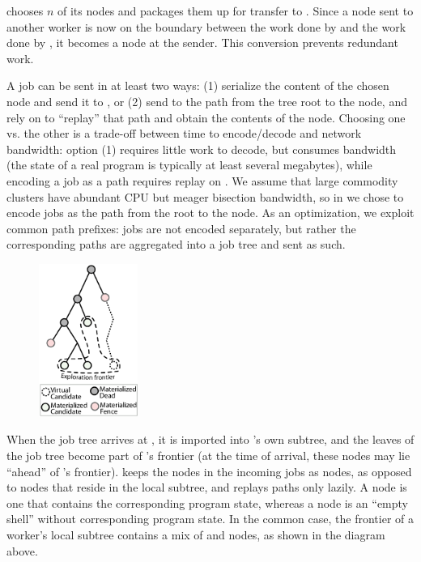 \wsrc chooses $n$ of its \candidate nodes and packages them up for transfer to \wdst.  Since a \candidate node sent to another worker is now on the boundary between the work done by \wsrc and the work done by \wdst, it becomes a \fence node at the sender.  This conversion prevents redundant work.

A job can be sent in at least two ways: (1) serialize the content of the chosen node and send it to \wdst, or (2) send to \wdst the path from the tree root to the node, and rely on \wdst to ``replay'' that path and obtain the contents of the node.  Choosing one vs. the other is a trade-off between time to encode/decode and network bandwidth: option (1) requires little work to decode, but consumes bandwidth (the state of a real program is typically at least several megabytes), while encoding a job as a path requires replay on \wdst.  We assume that large commodity clusters have abundant CPU but meager bisection bandwidth,
so in \cnine we chose to encode jobs as the path from the root to the \candidate node.  As an optimization, we exploit common path prefixes: jobs are not encoded separately, but rather the corresponding paths are aggregated into a job tree and sent as such.

\begin{figure}
\vspace{-5mm}
%
\hspace{-10mm}\includegraphics[height=50mm]{paas/figures/worker-tree-thumb}
\vspace{-8mm}
\end{figure}

When the job tree arrives at \wdst, it is imported into \wdst's own subtree, and the leaves of the job tree become part of \wdst's frontier (at the time of arrival, these nodes may lie ``ahead'' of \wdst's frontier).  \wdst keeps the nodes in the incoming jobs as {\em \virtual} nodes, as opposed to {\em \materialized} nodes that reside in the local subtree, and replays paths only lazily.  A \materialized node is one that contains the corresponding program state, whereas a \virtual node is an ``empty shell'' without corresponding program state.  In the common case, the frontier of a worker's local subtree contains a mix of \materialized and \virtual nodes, as shown in the diagram above.

